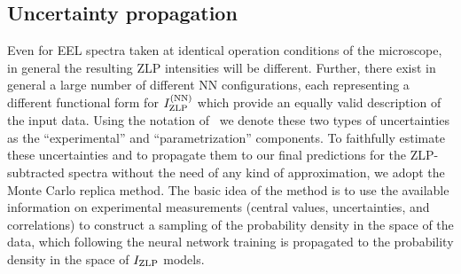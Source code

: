 %
%
%

\subsection{Uncertainty propagation}

Even for EEL spectra taken at identical operation conditions of the microscope,
in general the resulting ZLP intensities will be different.
%
Further, there exist in general a large number of different NN configurations, each
representing a different functional form for $I_{\rm ZLP}^{(\rm NN)}$ which provide
an equally valid description of the input data.
%
Using the notation of~\cite{Ball:2014uwa} we denote these two types of uncertainties
as the ``experimental'' and ``parametrization'' components.
%
To faithfully estimate these uncertainties and to propagate them to our final predictions
for the ZLP-subtracted spectra without the need of any kind of approximation,
we adopt the Monte Carlo replica method.
%
The basic idea of the method is to use the available information
on experimental measurements (central values, uncertainties, and correlations)
to construct a sampling of the probability density in the space of 
the data, which following the neural network training is propagated
to the probability density in the space of $I_{\rm ZLP}$ models.

%
%
%

